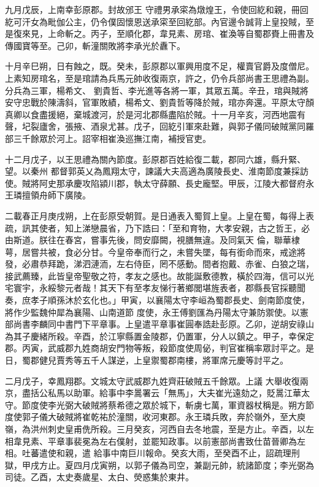 \begin{pinyinscope}
 九月戊辰，上南幸彭原郡。封故邠王
 守禮男承寀為燉煌王，令使回紇和親，冊回紇可汗女為毗伽公主，仍令僕固懷恩送承寀至回紇部。內官邊令誠背上皇投賊，至是復來見，上命斬之。丙子，至順化郡，韋見素、房琯、崔渙等自蜀郡賚上冊書及傳國寶等至。己卯，斬潼關敗將李承光於纛下。



 十月辛巳朔，日有蝕之，既。癸未，彭原郡以軍興用度不足，權賣官爵及度僧尼。上素知房琯名，至是琯請為兵馬元帥收復兩京，許之，仍令兵部尚書王思禮為副。分兵為三軍，楊希文、
 劉貴哲、李光進等各將一軍，其眾五萬。辛丑，琯與賊將安守忠戰於陳濤斜，官軍敗績，楊希文、劉貴哲等降於賊，琯亦奔還。平原太守顏真卿以食盡援絕，棄城渡河，於是河北郡縣盡陷於賊。十一月辛亥，河西地震有聲，圮裂廬舍，張掖、酒泉尤甚。戊子，回紇引軍來赴難，與郭子儀同破賊黨同羅部三千餘眾於河上。詔宰相崔渙巡撫江南，補授官吏。



 十二月戊子，以王思禮為關內節度。彭原郡百姓給復二載，郡同六雄，縣升緊、望。以秦州
 都督郭英乂為鳳翔太守，諫議大夫高適為廣陵長史、淮南節度兼採訪使。賊將阿史那承慶攻陷潁川郡，執太守薛願、長史龐堅。甲辰，江陵大都督府永王璘擅領舟師下廣陵。



 二載春正月庚戌朔，上在彭原受朝賀。是日通表入蜀賀上皇。上皇在蜀，每得上表疏，訊其使者，知上涕戀晨省，乃下誥曰：「至和育物，大孝安親，古之哲王，必由斯道。朕往在春宮，嘗事先後，問安靡闕，視膳無違。及同氣天
 倫，聯華棣萼，居嘗共被，食必分甘。今皇帝奉而行之，未嘗失墜，每有銜命而來，戒途將發，必肅恭拜跪，涕泗漣洏，左右侍臣，罔不感動。間者抱戴、赤雀、白狼之瑞，接武薦臻，此皆皇帝聖敬之符，孝友之感也。故能誕敷德教，橫於四海，信可以光宅寰宇，永綏黎元者哉！其天下有至孝友悌行著鄉閭堪旌表者，郡縣長官採聽聞奏，庶孝子順孫沐於玄化也。」甲寅，以襄陽太守李峘為蜀郡長史、劍南節度使，將作少監魏仲犀為襄陽、山南道節
 度使，永王傅劉匯為丹陽太守兼防禦使。以憲部尚書李麟同中書門下平章事。上皇遣平章事崔圓奉誥赴彭原。乙卯，逆胡安祿山為其子慶緒所殺。辛酉，於江寧縣置金陵郡，仍置軍，分人以鎮之。甲子，幸保定郡。丙寅，武威郡九姓商胡安門物等叛，殺節度使周佖，判官崔稱率眾討平之。是日，蜀郡健兒賈秀等五千人謀逆，上皇禦蜀郡南樓，將軍席元慶等討平之。



 二月戊子，幸鳳翔郡。文城太守武威郡九姓齊莊破賊五千餘眾。上議
 大舉收復兩京，盡括公私馬以助軍。給事中李暠署云「無馬」，大夫崔光遠劾之，貶暠江華太守。節度使李光弼大破賊將蔡希德之眾於城下，斬虜七萬，軍資器杖稱是。朔方節度使郭子儀大破賊將崔乾祐於潼關，收河東郡。永王璘兵敗，奔於嶺外，至大庾嶺，為洪州刺史皇甫侁所殺。三月癸亥，河西自去冬地震，至是方止。辛酉，以左相韋見素、平章事裴冕為左右僕射，並罷知政事。以前憲部尚書致仕苗晉卿為左相。吐蕃遣使和親，遣
 給事中南巨川報命。癸亥大雨，至癸酉不止，詔疏理刑獄，甲戌方止。夏四月戊寅朔，以郭子儀為司空，兼副元帥，統諸節度；李光弼為司徒。乙酉，太史奏歲星、太白、熒惑集於東井。




\end{pinyinscope}
